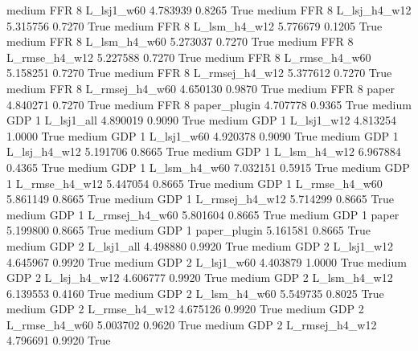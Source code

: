     medium      FFR                 8     L_lsj1_w60   4.783939      0.8265    True
    medium      FFR                 8   L_lsj_h4_w12   5.315756      0.7270    True
    medium      FFR                 8   L_lsm_h4_w12   5.776679      0.1205    True
    medium      FFR                 8   L_lsm_h4_w60   5.273037      0.7270    True
    medium      FFR                 8  L_rmse_h4_w12   5.227588      0.7270    True
    medium      FFR                 8  L_rmse_h4_w60   5.158251      0.7270    True
    medium      FFR                 8 L_rmsej_h4_w12   5.377612      0.7270    True
    medium      FFR                 8 L_rmsej_h4_w60   4.650130      0.9870    True
    medium      FFR                 8          paper   4.840271      0.7270    True
    medium      FFR                 8   paper_plugin   4.707778      0.9365    True
    medium      GDP                 1     L_lsj1_all   4.890019      0.9090    True
    medium      GDP                 1     L_lsj1_w12   4.813254      1.0000    True
    medium      GDP                 1     L_lsj1_w60   4.920378      0.9090    True
    medium      GDP                 1   L_lsj_h4_w12   5.191706      0.8665    True
    medium      GDP                 1   L_lsm_h4_w12   6.967884      0.4365    True
    medium      GDP                 1   L_lsm_h4_w60   7.032151      0.5915    True
    medium      GDP                 1  L_rmse_h4_w12   5.447054      0.8665    True
    medium      GDP                 1  L_rmse_h4_w60   5.861149      0.8665    True
    medium      GDP                 1 L_rmsej_h4_w12   5.714299      0.8665    True
    medium      GDP                 1 L_rmsej_h4_w60   5.801604      0.8665    True
    medium      GDP                 1          paper   5.199800      0.8665    True
    medium      GDP                 1   paper_plugin   5.161581      0.8665    True
    medium      GDP                 2     L_lsj1_all   4.498880      0.9920    True
    medium      GDP                 2     L_lsj1_w12   4.645967      0.9920    True
    medium      GDP                 2     L_lsj1_w60   4.403879      1.0000    True
    medium      GDP                 2   L_lsj_h4_w12   4.606777      0.9920    True
    medium      GDP                 2   L_lsm_h4_w12   6.139553      0.4160    True
    medium      GDP                 2   L_lsm_h4_w60   5.549735      0.8025    True
    medium      GDP                 2  L_rmse_h4_w12   4.675126      0.9920    True
    medium      GDP                 2  L_rmse_h4_w60   5.003702      0.9620    True
    medium      GDP                 2 L_rmsej_h4_w12   4.796691      0.9920    True
